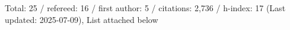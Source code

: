 Total: 25 / refereed: 16 / first author: 5 / citations: 2,736 / h-index: 17 (Last updated: 2025-07-09), List attached below